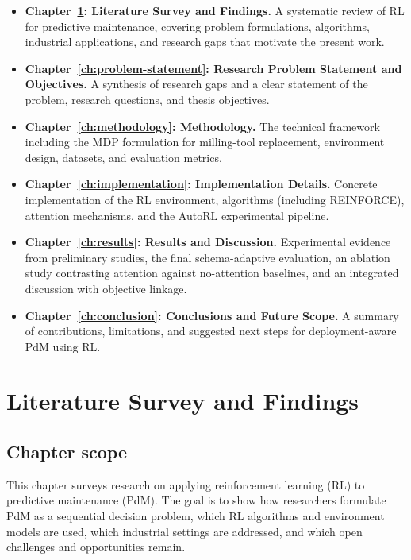 \documentclass[12pt,oneside]{book}
\begin{document}
\begin{itemize}
	\item \textbf{Chapter~\ref{ch:literature-survey}: Literature Survey and Findings.} A systematic review of RL for predictive maintenance, covering problem formulations, algorithms, industrial applications, and research gaps that motivate the present work.
	\item \textbf{Chapter~\ref{ch:problem-statement}: Research Problem Statement and Objectives.} A synthesis of research gaps and a clear statement of the problem, research questions, and thesis objectives.
	\item \textbf{Chapter~\ref{ch:methodology}: Methodology.} The technical framework including the MDP formulation for milling-tool replacement, environment design, datasets, and evaluation metrics.
	\item \textbf{Chapter~\ref{ch:implementation}: Implementation Details.} Concrete implementation of the RL environment, algorithms (including REINFORCE), attention mechanisms, and the AutoRL experimental pipeline.
	\item \textbf{Chapter~\ref{ch:results}: Results and Discussion.} Experimental evidence from preliminary studies, the final schema-adaptive evaluation, an ablation study contrasting attention against no-attention baselines, and an integrated discussion with objective linkage.
	\item \textbf{Chapter~\ref{ch:conclusion}: Conclusions and Future Scope.} A summary of contributions, limitations, and suggested next steps for deployment-aware PdM using RL.
\end{itemize}




\chapter{Literature Survey and Findings}\label{ch:literature-survey}

\section{Chapter scope}
This chapter surveys research on applying reinforcement learning (RL) to predictive maintenance (PdM). The goal is to show how researchers formulate PdM as a sequential decision problem, which RL algorithms and environment models are used, which industrial settings are addressed, and which open challenges and opportunities remain.
\end{document}

